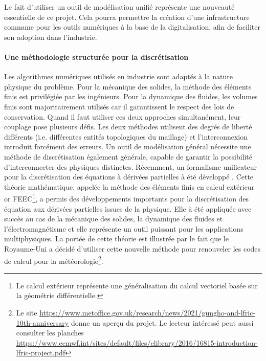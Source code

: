 \documentclass[12pt, french]{article}
\begin{document}
	Le fait d'utiliser un outil de modélisation unifié représente une nouveauté essentielle de ce projet. Cela pourra permettre la création d'une infrastructure commune pour les outils numériques à la base de la digitalisation, afin de faciliter son adoption dans l'industrie.
	
	

	\paragraph{\large Une méthodologie structurée pour la discrétisation \\}
	Les algorithmes numériques utilisés en industrie sont adaptés à la nature physique du problème. Pour la mécanique des solides, la méthode des éléments finis est privilégiée par les ingénieurs. Pour la dynamique des fluides, les volumes finis sont majoritairement utilisés car il garantissent le respect des lois de conservation. Quand il faut utiliser ces deux approches simultanément, leur couplage pose plusieurs défis. Les deux méthodes utilisent des degrés de liberté différents (i.e. différentes entités topologiques du maillage) et l'interconnexion introduit forcément des erreurs. Un outil de modélisation général nécessite une méthode de discrétisation également générale, capable de  garantir la possibilité d'interconnecter des physiques distinctes. Récemment, un formalisme unificateur pour la discrétisation des équations à dérivées partielles  à été développé  \cite{arnold2006acta}. Cette théorie mathématique, appelée la méthode des éléments finis en calcul extérieur or FEEC\footnote{Le calcul extérieur représente une généralisation du calcul vectoriel basée sur la géométrie différentielle.}, a permis des développements importants pour la discrétisation des équation aux dérivées partielles issues de la physique. Elle à été appliquée avec succès au cas de la mécanique des solides, la dynamique des fluides et l'électromagnétisme et elle représente un outil puissant pour les applications multiphysiques. La portée de cette théorie est illustrée par le fait que le Royaume-Uni a décidé d'utiliser cette nouvelle méthode pour renouveler les codes de calcul pour la météorologie\footnote{Le site \url{https://www.metoffice.gov.uk/research/news/2021/gungho-and-lfric-10th-anniversary} donne un aperçu du projet. Le lecteur intéressé peut aussi consulter les planches  \url{https://www.ecmwf.int/sites/default/files/elibrary/2016/16815-introduction-lfric-project.pdf}}.
	
\end{document}
